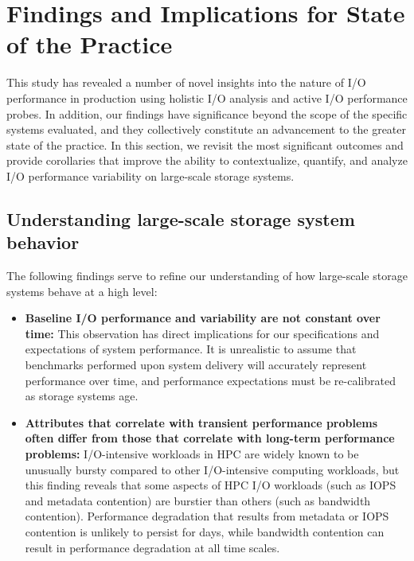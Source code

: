 \section{Findings and Implications for State of the Practice}
\label{sec:findings}


This study has revealed a number of novel insights into the nature of I/O performance in production using holistic I/O analysis and active I/O performance probes.
In addition, our findings have significance beyond the scope of the specific systems evaluated, and they collectively constitute an advancement to the greater state of the practice.
In this section, we revisit the most significant outcomes and provide corollaries that improve the ability to contextualize, quantify, and analyze I/O performance variability on large-scale storage systems.

\subsection{Understanding large-scale storage system behavior}

The following findings serve to refine our understanding of how large-scale storage
systems behave at a high level: 

\begin{itemize}[leftmargin=*]

\item \textbf{Baseline I/O performance and variability are not constant over
time:}
This observation has direct implications for our specifications and expectations of system performance.
It is unrealistic to assume that benchmarks performed upon system delivery will accurately represent performance over time, and performance expectations must be re-calibrated as storage systems age.

\item \textbf{Attributes that correlate with transient performance problems often differ from those that correlate with long-term performance problems:}
I/O-intensive workloads in HPC are widely known to be unusually bursty compared to other I/O-intensive computing workloads, but this finding reveals that some aspects of HPC I/O workloads (such as IOPS and metadata contention) are burstier than others (such as bandwidth contention).
Performance degradation that results from metadata or IOPS contention is unlikely to persist for days, while bandwidth contention can result in performance degradation at all time scales.

\end{itemize}


